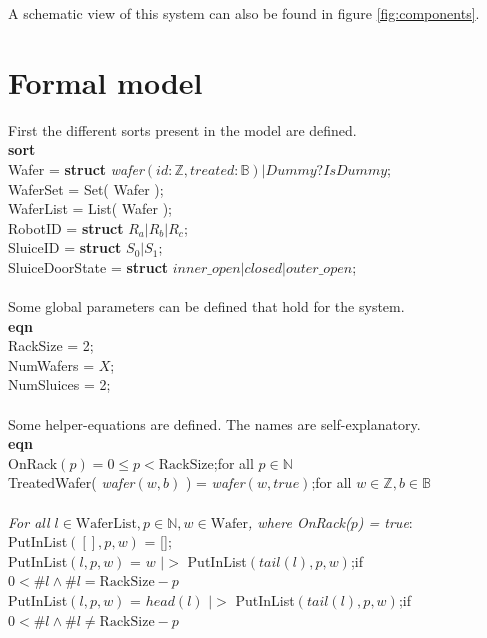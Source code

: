 \documentclass[12pt]{report}
\begin{document}
	A schematic view of this system can also be found in figure \ref{fig:components}.
	
	\section{Formal model}
	First the different sorts present in the model are defined.\\
	\textbf{sort}\\
	\phantom{----} Wafer = \textbf{struct} \emph{wafer}$( id:\mathbb{Z}, treated:\mathbb{B} ) | Dummy?IsDummy$;\\
	\phantom{----} WaferSet = Set( Wafer );\\
	\phantom{----} WaferList = List( Wafer );\\
	\phantom{----} RobotID = \textbf{struct} $R_a | R_b | R_c$;\\
	\phantom{----} SluiceID = \textbf{struct} $S_0 | S_1$;\\
	\phantom{----} SluiceDoorState = \textbf{struct} $inner\_open|closed|outer\_open$;\\
	\\
	Some global parameters can be defined that hold for the system.\\
	\textbf{eqn}\\
	\phantom{----} RackSize = 2;\\
	\phantom{----} NumWafers = $X$;\\
	\phantom{----} NumSluices = 2;\\
	\\
	Some helper-equations are defined. The names are self-explanatory.\\
	\textbf{eqn}\\
	\phantom{----} OnRack$( p ) = 0 \leq p < \text{RackSize}$;\hfill for all $p \in \mathbb{N}$\\
	\phantom{----} TreatedWafer(  \emph{wafer}$( w, b )$ ) =  \emph{wafer}$( w, true )$;\hfill for all $w \in \mathbb{Z}, b \in \mathbb{B}$\\
	\\
	\phantom{----} \emph{For all $l \in \text{WaferList}, p \in \mathbb{N}, w \in \text{Wafer}$, where OnRack($p$) = true}:\\
	\phantom{----} PutInList$( [], p, w )$ = [];\\
	\phantom{----} PutInList$( l, p, w )$ = $w$ $|>$ PutInList$( tail( l ), p, w )$;\hfill if $0 < \#l \land \#l = \text{RackSize} - p$\\
	\phantom{----} PutInList$( l, p, w )$ = $ head( l )$ $|>$ PutInList$( tail( l ), p, w )$;\hfill if $0 < \#l \land \#l \neq \text{RackSize} - p$\\
\end{document}
